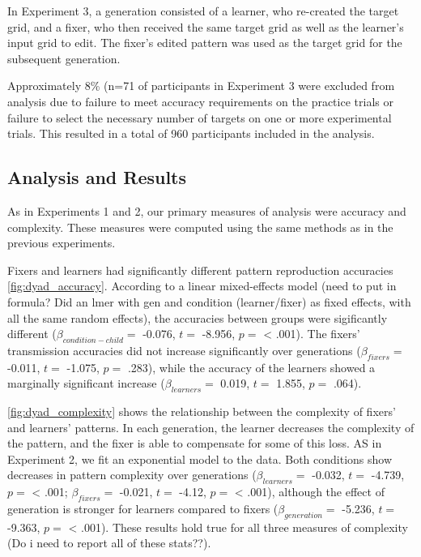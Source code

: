 \documentclass[10pt, letterpaper]{article}
\begin{document}
In Experiment 3, a generation consisted of a learner, who re-created the
target grid, and a fixer, who then received the same target grid as well
as the learner's input grid to edit. The fixer's edited pattern was used
as the target grid for the subsequent generation.

Approximately 8\% (n=71 of participants in Experiment 3 were excluded
from analysis due to failure to meet accuracy requirements on the
practice trials or failure to select the necessary number of targets on
one or more experimental trials. This resulted in a total of 960
participants included in the analysis.

\hypertarget{analysis-and-results}{%
\subsection{Analysis and Results}\label{analysis-and-results}}

As in Experiments 1 and 2, our primary measures of analysis were
accuracy and complexity. These measures were computed using the same
methods as in the previous experiments.

Fixers and learners had significantly different pattern reproduction
accuracies \ref{fig:dyad_accuracy}. According to a linear mixed-effects
model (need to put in formula? Did an lmer with gen and condition
(learner/fixer) as fixed effects, with all the same random effects), the
accuracies between groups were sigificantly different
(\(\beta_{condition-child} =\) -0.076, \(t =\) -8.956, \(p =\)
\textless{} .001). The fixers' transmission accuracies did not increase
significantly over generations (\(\beta_{fixers} =\) -0.011, \(t =\)
-1.075, \(p =\) .283), while the accuracy of the learners showed a
marginally significant increase (\(\beta_{learners} =\) 0.019, \(t =\)
1.855, \(p =\) .064).

\ref{fig:dyad_complexity} shows the relationship between the complexity
of fixers' and learners' patterns. In each generation, the learner
decreases the complexity of the pattern, and the fixer is able to
compensate for some of this loss. AS in Experiment 2, we fit an
exponential model to the data. Both conditions show decreases in pattern
complexity over generations (\(\beta_{learners} =\) -0.032, \(t =\)
-4.739, \(p =\) \textless{} .001; \(\beta_{fixers} =\) -0.021, \(t =\)
-4.12, \(p =\) \textless{} .001), although the effect of generation is
stronger for learners compared to fixers (\(\beta_{generation} =\)
-5.236, \(t =\) -9.363, \(p =\) \textless{} .001). These results hold
true for all three measures of complexity (Do i need to report all of
these stats??).
\end{document}
